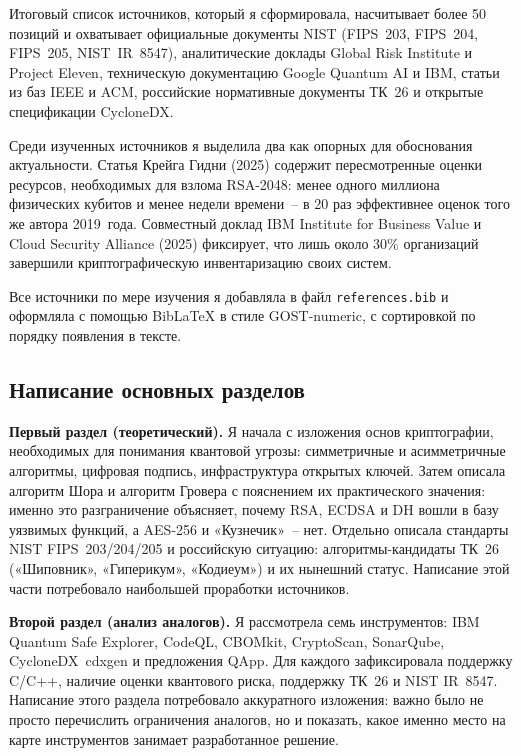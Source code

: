 \documentclass{itmo-vkr}
\begin{document}
Итоговый список источников, который я сформировала, насчитывает более 50 позиций и охватывает официальные документы NIST (FIPS~203, FIPS~204, FIPS~205, NIST~IR~8547), аналитические доклады Global Risk Institute и Project Eleven, техническую документацию Google Quantum AI и IBM, статьи из баз IEEE и ACM, российские нормативные документы ТК~26 и открытые спецификации CycloneDX.

Среди изученных источников я выделила два как опорных для обоснования актуальности. Статья Крейга Гидни (2025) содержит пересмотренные оценки ресурсов, необходимых для взлома RSA-2048: менее одного миллиона физических кубитов и менее недели времени~-- в 20 раз эффективнее оценок того же автора 2019~года. Совместный доклад IBM Institute for Business Value и Cloud Security Alliance (2025) фиксирует, что лишь около 30\% организаций завершили криптографическую инвентаризацию своих систем.

Все источники по мере изучения я добавляла в файл \texttt{references.bib} и оформляла с помощью BibLaTeX в стиле GOST-numeric, с сортировкой по порядку появления в тексте.

\subsection{Написание основных разделов}

\textbf{Первый раздел (теоретический).} Я начала с изложения основ криптографии, необходимых для понимания квантовой угрозы: симметричные и асимметричные алгоритмы, цифровая подпись, инфраструктура открытых ключей. Затем описала алгоритм Шора и алгоритм Гровера с пояснением их практического значения: именно это разграничение объясняет, почему RSA, ECDSA и DH вошли в базу уязвимых функций, а AES-256 и «Кузнечик»~-- нет. Отдельно описала стандарты NIST FIPS~203/204/205 и российскую ситуацию: алгоритмы-кандидаты ТК~26 («Шиповник», «Гиперикум», «Кодиеум») и их нынешний статус. Написание этой части потребовало наибольшей проработки источников.

\textbf{Второй раздел (анализ аналогов).} Я рассмотрела семь инструментов: IBM Quantum Safe Explorer, CodeQL, CBOMkit, CryptoScan, SonarQube, CycloneDX~cdxgen и предложения QApp. Для каждого зафиксировала поддержку C/C++, наличие оценки квантового риска, поддержку ТК~26 и NIST IR~8547. Написание этого раздела потребовало аккуратного изложения: важно было не просто перечислить ограничения аналогов, но и показать, какое именно место на карте инструментов занимает разработанное решение.
\end{document}
